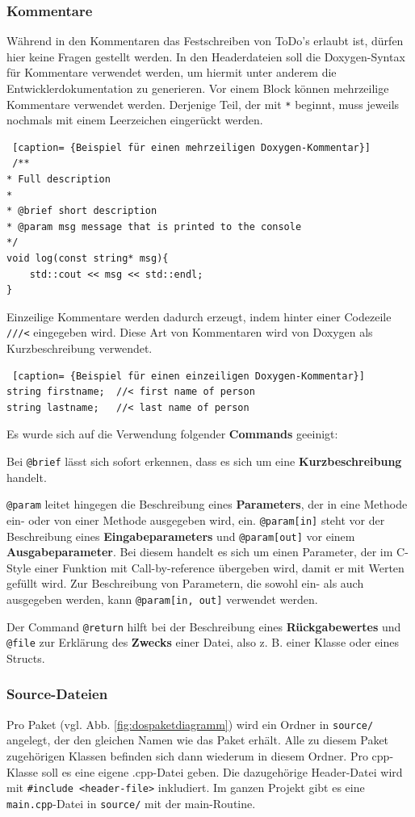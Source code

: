 \documentclass[../review_3.tex]{subfiles}
\begin{document}
\subsubsection{Kommentare}
Während in den Kommentaren das Festschreiben von ToDo's erlaubt ist, dürfen hier keine Fragen gestellt werden. In den Headerdateien soll die Doxygen-Syntax für Kommentare verwendet werden, um hiermit unter anderem die Entwicklerdokumentation zu generieren. Vor einem Block können mehrzeilige Kommentare verwendet werden. Derjenige Teil, der mit \texttt{*} beginnt, muss jeweils nochmals mit einem Leerzeichen eingerückt werden.
\begin{lstlisting} [caption= {Beispiel für einen mehrzeiligen Doxygen-Kommentar}]
 /**
* Full description
*
* @brief short description
* @param msg message that is printed to the console
*/
void log(const string* msg){
    std::cout << msg << std::endl;
} \end{lstlisting}
Einzeilige Kommentare werden dadurch erzeugt, indem hinter einer Codezeile \texttt{///<} eingegeben wird. Diese Art von Kommentaren wird von Doxygen als Kurzbeschreibung verwendet.
\begin{lstlisting} [caption= {Beispiel für einen einzeiligen Doxygen-Kommentar}]
string firstname;  //< first name of person
string lastname;   //< last name of person
\end{lstlisting}

Es wurde sich auf die Verwendung folgender \textbf{Commands} geeinigt:

Bei \texttt{@brief} lässt sich sofort erkennen, dass es sich um eine \textbf{Kurzbeschreibung} handelt.

\texttt{@param} leitet hingegen die Beschreibung eines \textbf{Parameters}, der in eine Methode ein- oder von einer Methode ausgegeben wird, ein. \texttt{@param[in]} steht vor der Beschreibung eines \textbf{Eingabeparameters} und \texttt{@param[out]} vor einem \textbf{Ausgabeparameter}. Bei diesem handelt es sich um einen Parameter, der im C-Style einer Funktion mit Call-by-reference übergeben wird, damit er mit Werten gefüllt wird. Zur Beschreibung von Parametern, die sowohl ein- als auch ausgegeben werden, kann \texttt{@param[in, out]} verwendet werden.

Der Command \texttt{@return} hilft bei der Beschreibung eines \textbf{Rückgabewertes} und \texttt{@file} zur Erklärung des \textbf{Zwecks} einer Datei, also z. B. einer Klasse oder eines Structs.

\subsubsection{Source-Dateien}
Pro Paket (vgl. Abb. \ref{fig:dospaketdiagramm}) wird ein Ordner in \texttt{source/} angelegt, der den gleichen Namen wie das Paket erhält. Alle zu diesem Paket zugehörigen Klassen befinden sich dann wiederum in diesem Ordner. Pro cpp-Klasse soll es eine eigene .cpp-Datei geben. Die dazugehörige Header-Datei  wird mit \texttt{\#include <header-file>} inkludiert. Im ganzen Projekt gibt es eine \texttt{main.cpp}-Datei in \texttt{source/} mit der main-Routine.
\end{document}
